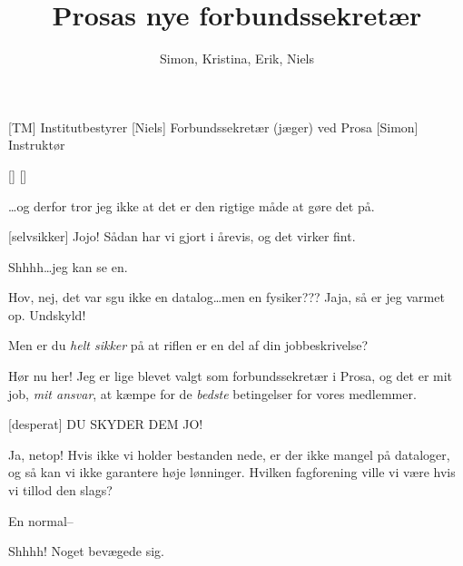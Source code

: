 \documentclass[a4paper,11pt]{article}
\title{Prosas nye forbundssekretær}
\author{Simon, Kristina, Erik, Niels}
\begin{document}
\maketitle

\begin{roles}
[TM] Institutbestyrer
[Niels] Forbundssekretær (jæger) ved Prosa
[Simon] Instruktør
\end{roles}

\begin{props}
[]
[]
\end{props}

\begin{sketch}



 \ldots og derfor tror jeg ikke at det er den rigtige måde at gøre det
på.

[selvsikker] Jojo!  Sådan har vi gjort i årevis, og det virker fint.


 Shhhh\ldots jeg kan se en.


  Hov, nej, det var sgu ikke en datalog\ldots men
en fysiker???  Jaja, så er jeg varmet op.   Undskyld!

  Men er du \emph{helt
sikker} på at riflen er en del af din jobbeskrivelse?

 Hør nu her!   Jeg er lige blevet valgt som
forbundssekretær i Prosa, og det er mit job, \emph{mit ansvar}, at
kæmpe for de \emph{bedste} betingelser for vores medlemmer.

[desperat] DU SKYDER DEM JO!

 Ja, netop!   Hvis ikke vi holder
bestanden nede, er der ikke mangel på dataloger, og så kan vi ikke garantere
høje lønninger.  Hvilken fagforening ville vi være hvis vi tillod den slags?

 En normal--

 Shhhh!  Noget bevægede sig.


\end{sketch}
\end{document}
